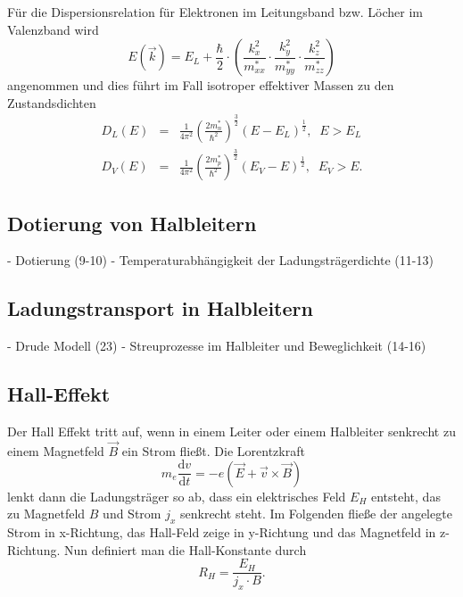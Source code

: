 Für die Dispersionsrelation für Elektronen im Leitungsband bzw. Löcher im Valenzband wird
\begin{equation}
 E(\vec k)= E_L + \frac{\hbar}{2}\cdot \left(\frac{k_x^2}{m^*_{xx}}\cdot \frac{k_y^2}{m^*_{yy}}\cdot\frac{k_z^2}{m^*_{zz}} \right)
\end{equation}
angenommen und dies führt im Fall isotroper effektiver Massen zu den Zustandsdichten
\begin{eqnarray}
 D_L(E)&=&\frac{1}{4\pi^2}\left(\frac{2m_n^*}{\hbar^2}\right)^\frac{3}{2}(E-E_L)^\frac{1}{2},\;\; E>E_L\\
 D_V(E)&=&\frac{1}{4\pi^2}\left(\frac{2m_p^*}{\hbar^2}\right)^\frac{3}{2}(E_V-E)^\frac{1}{2},\;\; E_V>E.
\end{eqnarray}


\subsection{Dotierung von Halbleitern}
- Dotierung (9-10)
- Temperaturabhängigkeit der Ladungsträgerdichte (11-13)

\subsection{Ladungstransport in Halbleitern}
- Drude Modell (23)
- Streuprozesse im Halbleiter und Beweglichkeit (14-16)

\subsection{Hall-Effekt}
Der Hall Effekt tritt auf, wenn in einem Leiter oder einem Halbleiter senkrecht zu einem Magnetfeld $\vec B$ ein Strom fließt. Die Lorentzkraft
\begin{equation}
 m_e\frac{\mathrm d v}{\mathrm d t}= -e(\vec E + \vec v \times \vec B)
\end{equation}
lenkt dann die Ladungsträger so ab, dass ein elektrisches Feld $E_H$ entsteht, das zu Magnetfeld $B$ und Strom $j_x$ senkrecht steht. Im Folgenden fließe der angelegte Strom in x-Richtung, das Hall-Feld zeige in y-Richtung und das Magnetfeld in z-Richtung. Nun definiert man die Hall-Konstante durch 
\begin{equation}
 R_H=\frac{E_H}{j_x\cdot B}.
\end{equation}

